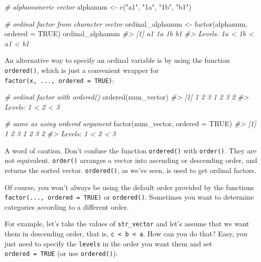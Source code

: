 \documentclass[
]{book}
\newenvironment{Shaded}{\begin{snugshade}}{\end{snugshade}}
\newcommand{\AttributeTok}[1]{\textcolor[rgb]{0.77,0.63,0.00}{#1}}
\newcommand{\CommentTok}[1]{\textcolor[rgb]{0.56,0.35,0.01}{\textit{#1}}}
\newcommand{\ConstantTok}[1]{\textcolor[rgb]{0.00,0.00,0.00}{#1}}
\newcommand{\FunctionTok}[1]{\textcolor[rgb]{0.00,0.00,0.00}{#1}}
\newcommand{\NormalTok}[1]{#1}
\newcommand{\OtherTok}[1]{\textcolor[rgb]{0.56,0.35,0.01}{#1}}
\newcommand{\StringTok}[1]{\textcolor[rgb]{0.31,0.60,0.02}{#1}}
\begin{document}
\begin{Shaded}
\begin{Highlighting}[]
\CommentTok{\# alphanumeric vector}
\NormalTok{alphanum }\OtherTok{\textless{}{-}} \FunctionTok{c}\NormalTok{(}\StringTok{"a1"}\NormalTok{, }\StringTok{"1a"}\NormalTok{, }\StringTok{"1b"}\NormalTok{, }\StringTok{"b1"}\NormalTok{)}

\CommentTok{\# ordinal factor from character vector}
\NormalTok{ordinal\_alphanum }\OtherTok{\textless{}{-}} \FunctionTok{factor}\NormalTok{(alphanum, }\AttributeTok{ordered =} \ConstantTok{TRUE}\NormalTok{)}
\NormalTok{ordinal\_alphanum}
\CommentTok{\#\textgreater{} [1] a1 1a 1b b1}
\CommentTok{\#\textgreater{} Levels: 1a \textless{} 1b \textless{} a1 \textless{} b1}
\end{Highlighting}
\end{Shaded}

An alternative way to specify an ordinal variable is by using the function
\texttt{ordered()}, which is just a convenient wrapper for
\texttt{factor(x,\ ...,\ ordered\ =\ TRUE)}:

\begin{Shaded}
\begin{Highlighting}[]
\CommentTok{\# ordinal factor with ordered()}
\FunctionTok{ordered}\NormalTok{(num\_vector)}
\CommentTok{\#\textgreater{} [1] 1 2 3 1 2 3 2}
\CommentTok{\#\textgreater{} Levels: 1 \textless{} 2 \textless{} 3}

\CommentTok{\# same as using \textquotesingle{}ordered\textquotesingle{} argument}
\FunctionTok{factor}\NormalTok{(num\_vector, }\AttributeTok{ordered =} \ConstantTok{TRUE}\NormalTok{)}
\CommentTok{\#\textgreater{} [1] 1 2 3 1 2 3 2}
\CommentTok{\#\textgreater{} Levels: 1 \textless{} 2 \textless{} 3}
\end{Highlighting}
\end{Shaded}

A word of caution. Don't confuse the function \texttt{ordered()} with \texttt{order()}. They
are not equivalent. \texttt{order()} arranges a vector into ascending or descending
order, and returns the sorted vector. \texttt{ordered()}, as we've seen, is used to
get ordinal factors.

Of course, you won't always be using the default order provided by the
functions \texttt{factor(...,\ ordered\ =\ TRUE)} or \texttt{ordered()}. Sometimes you want to
determine categories according to a different order.

For example, let's take the values of \texttt{str\_vector} and let's assume that we
want them in descending order, that is, \texttt{c\ \textless{}\ b\ \textless{}\ a}. How can you do that? Easy,
you just need to specify the \texttt{levels} in the order you want them and set
\texttt{ordered\ =\ TRUE} (or use \texttt{ordered()}):
\end{document}
